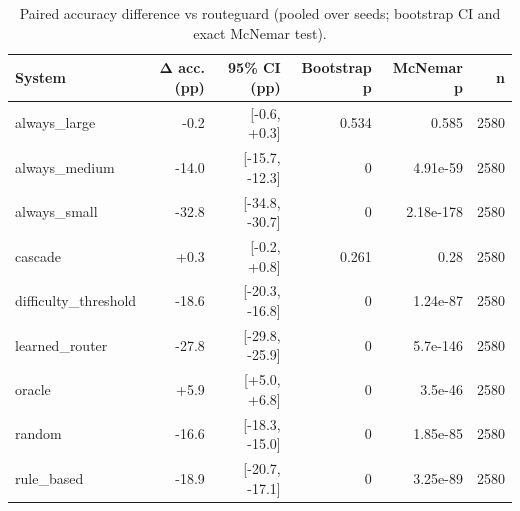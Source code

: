 \begin{table}[t]
\centering
\small
\caption{Paired accuracy difference vs routeguard (pooled over seeds; bootstrap CI and exact McNemar test).}
\label{tab:significance}
\begin{tabular}{lrrrrr}
\toprule
System & Δ acc. (pp) & 95\% CI (pp) & Bootstrap p & McNemar p & n \\
\midrule
always\_large & -0.2 & [-0.6, +0.3] & 0.534 & 0.585 & 2580 \\
always\_medium & -14.0 & [-15.7, -12.3] & 0 & 4.91e-59 & 2580 \\
always\_small & -32.8 & [-34.8, -30.7] & 0 & 2.18e-178 & 2580 \\
cascade & +0.3 & [-0.2, +0.8] & 0.261 & 0.28 & 2580 \\
difficulty\_threshold & -18.6 & [-20.3, -16.8] & 0 & 1.24e-87 & 2580 \\
learned\_router & -27.8 & [-29.8, -25.9] & 0 & 5.7e-146 & 2580 \\
oracle & +5.9 & [+5.0, +6.8] & 0 & 3.5e-46 & 2580 \\
random & -16.6 & [-18.3, -15.0] & 0 & 1.85e-85 & 2580 \\
rule\_based & -18.9 & [-20.7, -17.1] & 0 & 3.25e-89 & 2580 \\
\bottomrule
\end{tabular}
\end{table}
